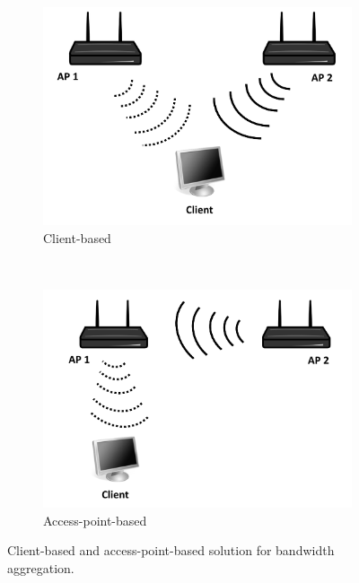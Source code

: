 
\begin{figure}[tb]
    \centering
    \begin{subfigure}[t]{0.5\textwidth}
        \centering
        \includegraphics[width=.9\textwidth]{aggregation/background/figures/aggr_client_sw}
        \caption{Client-based}
				\label{fig:aggregation:background:aggrclient}
    \end{subfigure}%
    ~
    \begin{subfigure}[t]{0.5\textwidth}
        \centering
        \includegraphics[width=.9\textwidth]{aggregation/background/figures/aggr_ap_sw}
        \caption{Access-point-based}
				\label{fig:aggregation:background:aggrap}
    \end{subfigure}
    \caption{Client-based and access-point-based solution for bandwidth aggregation.}
		\label{fig:aggregation:background:aggr}
\end{figure}

